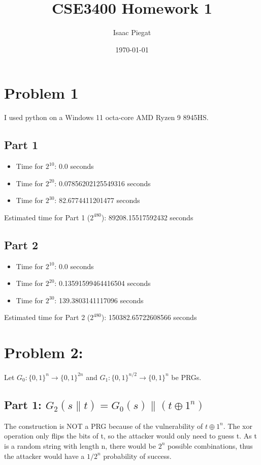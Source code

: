 \documentclass{article} %
\title{CSE3400 Homework 1} %
\author{Isaac Piegat} %
\date{\today} %
\begin{document}
\maketitle %

\section{Problem 1} %
I used python on a Windows 11 octa-core AMD Ryzen 9 8945HS. 

\subsection{Part 1} %
\begin{itemize}
    \item Time for $2^{10}$: 0.0 seconds 
    \item Time for $2^{20}$: 0.07856202125549316 seconds
    \item Time for $2^{30}$: 82.6774411201477 seconds
\end{itemize}

Estimated time for Part 1 ($2^{480}$): 89208.15517592432 seconds

\subsection{Part 2}
\begin{itemize}
    \item Time for $2^{10}$: 0.0 seconds
    \item Time for $2^{20}$: 0.13591599464416504 seconds
    \item Time for $2^{30}$: 139.3803141117096 seconds
\end{itemize}

Estimated time for Part 2 ($2^{480}$): 150382.65722608566 seconds

\section{Problem 2:}
Let \( G_0: \{0,1\}^n \to \{0,1\}^{2n} \) and \( G_1: \{0,1\}^{n/2} \to \{0,1\}^n \) be PRGs.

\subsection{Part 1: \(G_2(s \parallel t) = G_0(s) \parallel (t \oplus 1^n)\)}
The construction is NOT a PRG because of the vulnerability of \(t \oplus 1^n\). The xor operation only flips the bits of t, so the attacker would only need to guess t. As t is a random string with length n, there would be \(2^n\) possible combinations, thus the attacker would have a \(1/2^n\) probability of success. 
\end{document}
